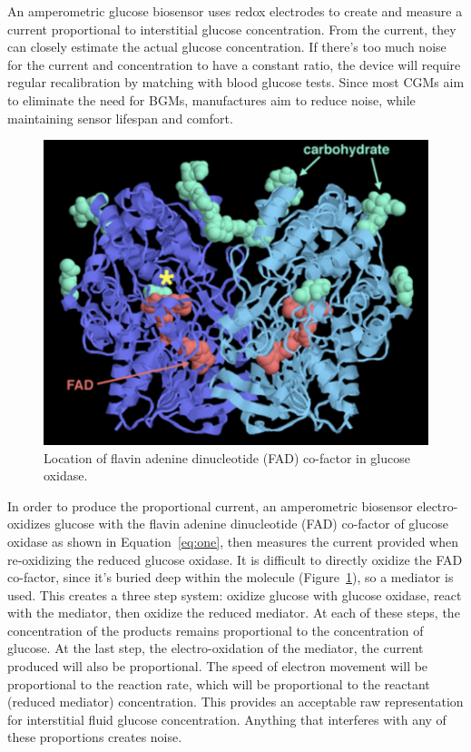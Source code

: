 An amperometric glucose biosensor uses redox electrodes to create and measure a current proportional to interstitial glucose concentration. From the current, they can closely estimate the actual glucose concentration. If there’s too much noise for the current and concentration to have a constant ratio, the device will require regular recalibration by matching with blood glucose tests. Since most CGMs aim to eliminate the need for BGMs, manufactures aim to reduce noise, while maintaining sensor lifespan and comfort.

\begin{figure}[ht]
\centering\includegraphics[width=1.0\linewidth]{images/mom.png}
\caption{Location of flavin adenine dinucleotide (FAD) co-factor in glucose oxidase.}
\label{fig:mom}
\end{figure}

In order to produce the proportional current, an amperometric biosensor electro-oxidizes glucose with the  flavin adenine dinucleotide (FAD) co-factor of glucose oxidase as shown in Equation~\ref{eq:one}, then measures the current provided when re-oxidizing the reduced glucose oxidase. It is difficult to directly oxidize the FAD co-factor, since it’s buried deep within the molecule (Figure~\ref{fig:mom}), so a mediator is used. This creates a three step system: oxidize glucose with glucose oxidase, react with the mediator, then oxidize the reduced mediator. At each of these steps, the concentration of the products remains proportional to the concentration of glucose. At the last step, the electro-oxidation of the mediator, the current produced will also be proportional. The speed of electron movement will be proportional to the reaction rate, which will be proportional to the reactant (reduced mediator) concentration\cite{noauthor_amperometric_nodate}. This provides an acceptable raw representation for interstitial fluid glucose concentration. Anything that interferes with any of these proportions creates noise.

